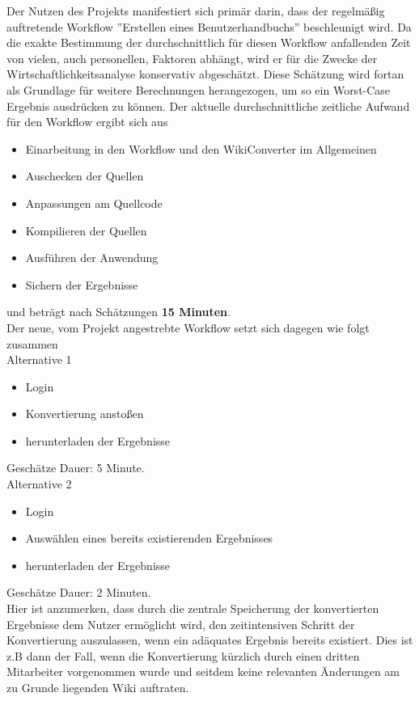 \documentclass[12pt, xcolor=dvipsnames]{scrartcl}
\begin{document}
Der Nutzen des Projekts manifestiert sich primär darin, dass der regelmäßig auftretende Workflow ''Erstellen eines Benutzerhandbuchs'' beschleunigt wird.
Da die exakte Bestimmung der durchschnittlich für diesen Workflow anfallenden Zeit von vielen, auch personellen, Faktoren abhängt, wird er für die Zwecke der Wirtschaftlichkeitsanalyse konservativ abgeschätzt. Diese Schätzung wird fortan als Grundlage für weitere Berechnungen herangezogen, um so ein Worst-Case Ergebnis ausdrücken zu können.
Der aktuelle durchschnittliche zeitliche Aufwand für den Workflow ergibt sich aus
\begin{itemize}
	\item Einarbeitung in den Workflow und den WikiConverter im Allgemeinen
	\item Auschecken der Quellen
	\item Anpassungen am Quellcode
	\item Kompilieren der Quellen
	\item Ausführen der Anwendung
	\item Sichern der Ergebnisse
\end{itemize}
und beträgt nach Schätzungen \textbf{15 Minuten}. \\

Der neue, vom Projekt angestrebte Workflow setzt sich dagegen wie folgt zusammen \\

Alternative 1
\begin{itemize}
	\item Login
	\item Konvertierung anstoßen
	\item herunterladen der Ergebnisse
\end{itemize}
Geschätze Dauer: 5 Minute. \\

Alternative 2
\begin{itemize}
	\item Login
	\item Auswählen eines bereits existierenden Ergebnisses
	\item herunterladen der Ergebnisse
\end{itemize}
Geschätze Dauer: 2 Minuten. \\


Hier ist anzumerken, dass durch die zentrale Speicherung der konvertierten Ergebnisse dem Nutzer ermöglicht wird, den zeitintensiven Schritt der Konvertierung auszulassen, wenn ein adäquates Ergebnis bereits existiert. Dies ist z.B dann der Fall, wenn die Konvertierung kürzlich durch einen dritten Mitarbeiter vorgenommen wurde und seitdem keine relevanten Änderungen am zu Grunde liegenden Wiki auftraten.
\end{document}
